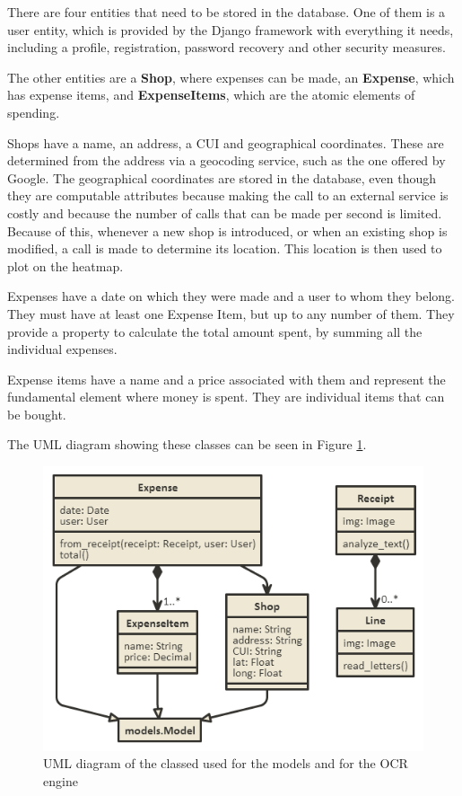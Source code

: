 There are four entities that need to be stored in the database. One of them is a user entity, which is provided by the Django framework with everything it needs, including a profile, registration, password recovery and other security measures. 

The other entities are a \textbf{Shop}, where expenses can be made, an \textbf{Expense}, which has expense items, and \textbf{ExpenseItems}, which are the atomic elements of spending. 

Shops have a name, an address, a CUI and geographical coordinates. These are determined from the address via a geocoding service, such as the one offered by Google. The geographical coordinates are stored in the database, even though they are computable attributes because making the call to an external service is costly and because the number of calls that can be made per second is limited. Because of this, whenever a new shop is introduced, or when an existing shop is modified, a call is made to determine its location. This location is then used to plot on the heatmap.

Expenses have a date on which they were made and a user to whom they belong. They must have at least one Expense Item, but up to any number of them. They provide a property to calculate the total amount spent, by summing all the individual expenses. 

Expense items have a name and a price associated with them and represent the fundamental element where money is spent. They are individual items that can be bought. 

The UML diagram showing these classes can be seen in Figure \ref{fig:classes}.

\begin{figure}[h!]
\begin{center}
\includegraphics[width=\linewidth]{img/classes.png}
\caption{\label{fig:classes}
UML diagram of the classed used for the models and for the OCR engine}
\end{center}
\end{figure}

